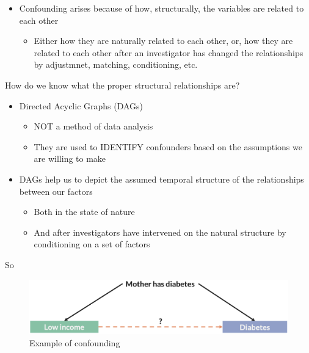 \documentclass[
]{book}
\providecommand{\tightlist}{%
  \setlength{\itemsep}{0pt}\setlength{\parskip}{0pt}}
\begin{document}
\begin{itemize}
\tightlist
\item
  Confounding arises because of how, structurally, the variables are related to each other

  \begin{itemize}
  \tightlist
  \item
    Either how they are naturally related to each other, or, how they are related to each other after an investigator has changed the relationships by adjustmnet, matching, conditioning, etc.
  \end{itemize}
\end{itemize}

How do we know what the proper structural relationships are?

\begin{itemize}
\tightlist
\item
  Directed Acyclic Graphs (DAGs)

  \begin{itemize}
  \tightlist
  \item
    NOT a method of data analysis
  \item
    They are used to IDENTIFY confounders based on the assumptions we are willing to make
  \end{itemize}
\item
  DAGs help us to depict the assumed temporal structure of the relationships between our factors

  \begin{itemize}
  \tightlist
  \item
    Both in the state of nature
  \item
    And after investigators have intervened on the natural structure by conditioning on a set of factors
  \end{itemize}
\end{itemize}

So

\begin{figure}

{\centering \includegraphics[width=1\linewidth]{img/confounding/confounding_example} 

}

\caption{Example of confounding}\label{fig:unnamed-chunk-14}
\end{figure}
\end{document}
